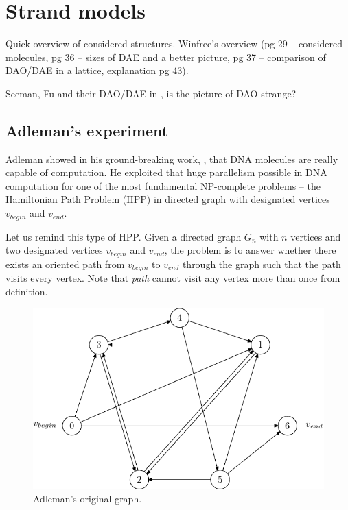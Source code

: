 
\section{Strand models}
	
	Quick overview of considered structures. Winfree's overview (pg 29 -- considered molecules, pg 36 -- sizes of DAE and a better picture, pg 37 -- comparison of DAO/DAE in a lattice, explanation pg 43).
	
	Seeman, Fu and their DAO/DAE in \cite{seeman93}, is the picture of DAO strange?

\subsection{Adleman's experiment}
	
	Adleman showed in his ground-breaking work, \cite{adleman94}, that DNA molecules are really capable of computation. He exploited that huge parallelism possible in DNA computation for one of the most fundamental NP-complete problems -- the Hamiltonian Path Problem (HPP) in directed graph with designated vertices $v_{begin}$ and $v_{end}$.
	
	Let us remind this type of HPP. Given a directed graph $G_n$ with $n$ vertices and two designated vertices $v_{begin}$ and $v_{end}$, the problem is to answer whether there exists an oriented path from $v_{begin}$ to $v_{end}$ through the graph such that the path visits every vertex. Note that {\em path} cannot visit any vertex more than once from definition.
	
	\begin{figure}[H]
	\begin{center}
		\includegraphics{./figures/adleman_graph.pdf}
		\caption{Adleman's original graph.}
		\label{fig:adleman_graph}
	\end{center}
	\end{figure}
	
